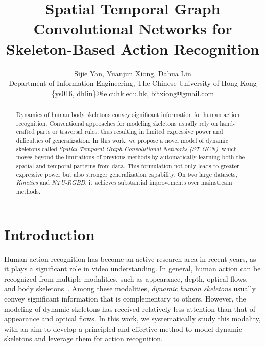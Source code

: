 \documentclass[letterpaper]{article} \usepackage{aaai18}  \usepackage{times}  \usepackage{helvet}  \usepackage{courier}  \usepackage{url}  \usepackage{graphicx}
\begin{document}
\title{Spatial Temporal Graph Convolutional Networks for Skeleton-Based Action Recognition}
\author{Sijie Yan, Yuanjun Xiong, Dahua Lin\\
Department of Information Engineering, The Chinese University of Hong Kong\\
\{ys016, dhlin\}@ie.cuhk.edu.hk, bitxiong@gmail.com\\
}
\maketitle

\begin{abstract}

Dynamics of human body skeletons convey significant information
for human action recognition. Conventional approaches for modeling
skeletons usually rely on hand-crafted parts or traversal rules,
thus resulting in limited expressive power and difficulties
of generalization.
In this work, we propose a novel model of dynamic skeletons
called \emph{Spatial-Temporal Graph Convolutional Networks (ST-GCN)},
which moves beyond the limitations of previous methods by
automatically learning both the spatial and temporal patterns from data.
This formulation not only leads to greater expressive power
but also stronger generalization capability.
On two large datasets,
\emph{Kinetics} and \emph{NTU-RGBD}, it achieves substantial
improvements over mainstream methods.

\end{abstract}

\section{Introduction}

Human action recognition has become an active research area in recent years,
as it plays a significant role in video understanding.
In general, human action can be recognized from multiple modalities\cite{Simonyan2014NIPS,Tran2015C3D,Wang2015action,TSN2016ECCV,SSN2017ICCV},
such as appearance, depth, optical flows, and body skeletons~\cite{Du2015CVPR,Liu2016ECCV}.
Among these modalities, \emph{dynamic human skeletons} usually convey
significant information that is complementary to others.
However, the modeling of dynamic skeletons has received relatively less
attention than that of appearance and optical flows.
In this work, we systematically study this modality, with an aim to
develop a principled and effective method to model dynamic skeletons
and leverage them for action recognition.
\end{document}
